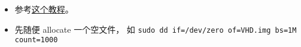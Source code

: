 
\begin{issues}
\issueDraft
\end{issues}

\begin{itemize}
\item 参考\href{https://www.tecmint.com/create-virtual-harddisk-volume-in-linux/}{这个教程}。
\item 先随便 allocate 一个空文件， 如 \verb|sudo dd if=/dev/zero of=VHD.img bs=1M count=1000|
\end{itemize}
